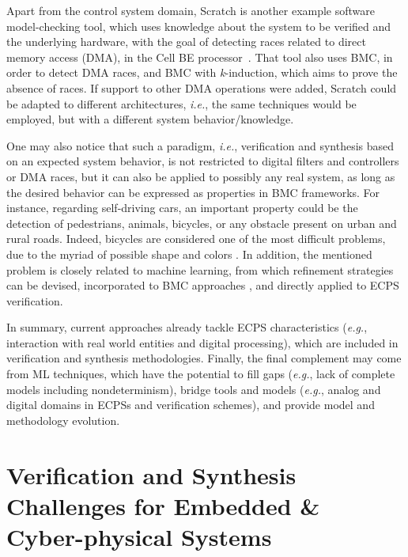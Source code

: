 \documentclass{cta-author}
\begin{document}
Apart from the control system domain, Scratch is another example software model-checking tool, which uses knowledge about the system to be verified and the underlying hardware, with the goal of detecting races related to direct memory access (DMA), in the Cell BE processor~\cite{Donaldson10}. That tool also uses BMC, in order to detect DMA races, and BMC with \textit{k}-induction, which aims to prove the absence of races. If support to other DMA operations were added, Scratch could be adapted to different architectures, {\it i.e.}, the same techniques would be employed, but with a different system behavior/knowledge.

One may also notice that such a paradigm, {\it i.e.}, verification and synthesis based on an expected system behavior, is not restricted to digital filters and controllers or DMA races, but it can also be applied to possibly any real system, as long as the desired behavior can be expressed as properties in BMC frameworks. For instance, regarding self-driving cars, an important property could be the detection of pedestrians, animals, bicycles, or any obstacle present on urban and rural roads. Indeed, bicycles are considered one of the most difficult problems, due to the myriad of possible shape and colors \cite{selfcar}. In addition, the mentioned problem is closely related to machine learning, from which refinement strategies can be devised, incorporated to BMC approaches \cite{BMCml}, and directly applied to ECPS verification.

In summary, current approaches already tackle ECPS characteristics ({\it e.g.}, interaction with real world entities and digital processing), which are included in verification and synthesis methodologies. Finally, the final complement may come from ML techniques, which have the potential to fill gaps ({\it e.g.}, lack of complete models including nondeterminism), bridge tools and models ({\it e.g.}, analog and digital domains in ECPSs and verification schemes), and provide model and methodology evolution.  


\section{Verification and Synthesis \\ Challenges for Embedded \& Cyber-physical Systems}
\label{Verification-Challenges} 
\end{document}

